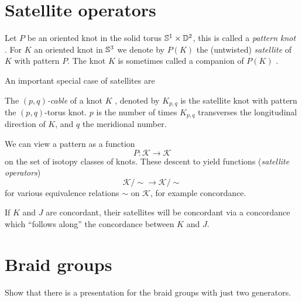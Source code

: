 \newpage
\section{Satellite operators}

\citep{cochran2014injectivity}

Let $P$ be an oriented knot in the solid torus $\mathbb{S}^{1} \times \mathbb{D}^{2}$,
this is called a \textit{pattern knot} .
For $K$ an oriented knot in $\mathbb{S}^{3}$ we denote by $P(K)$
the (untwisted) \textit{satellite}  of $K$
with pattern $P$. The knot $K$ is sometimes called
a companion
of $P(K)$ \citep[p. 10]{lickorish2012introduction}.

An important special case of satellites are
\begin{definition}[$(p,q)$-cables]
	The \textit{$(p,q)$-cable} of a knot $K$
	,
	denoted by $K_{p, q}$
	is the satellite knot with pattern the $(p, q)$-torus knot.
	$p$ is the number of times $K_{p, q}$ transverses
	the longitudinal direction of $K$,
	and $q$ the meridional number.
\end{definition}

We can view a pattern as a function
\begin{equation*}
	P \colon \mathcal{K} \rightarrow \mathcal{K}
\end{equation*}
on the set of isotopy classes of
knots.
These descent to yield functions (\textit{satellite operators})
\begin{equation*}
	\mathcal{K} / \sim \rightarrow \mathcal{K}/ \sim
\end{equation*}
for various equivalence relations $\sim$ on $\mathcal{K}$, for example
concordance.

If $K$ and $J$ are concordant, their satellites will be concordant
via a concordance which ``follows along'' the concordance between
$K$ and $J$.



\section{Braid groups}

\begin{exercise}
	Show that there is a presentation for the braid groups
	with just two generators.
\end{exercise}

